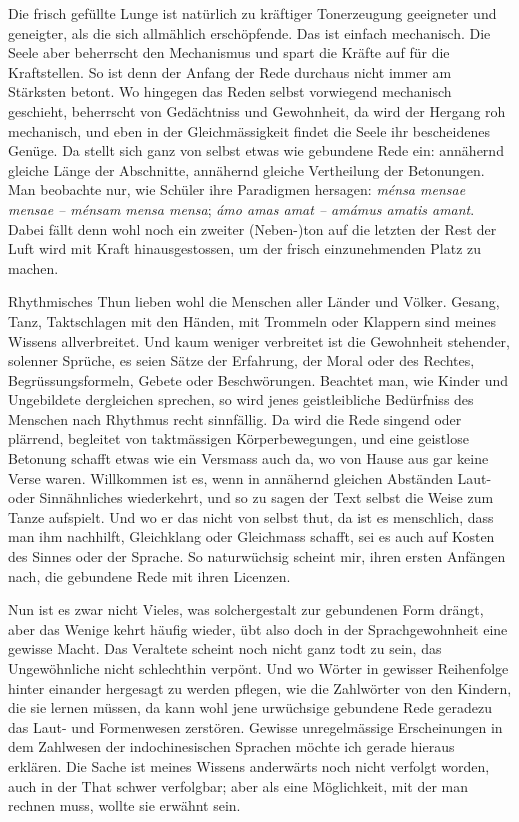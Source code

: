 {Die frisch gefüllte Lunge ist natürlich zu kräftiger Tonerzeugung geeigneter und geneigter, als die sich allmählich erschöpfende. Das ist einfach mechanisch. Die Seele aber beherrscht den Mechanismus und \label{fp.224} spart die Kräfte auf für die Kraftstellen. So ist denn der Anfang der Rede durchaus nicht immer am Stärksten betont. Wo hingegen das Reden selbst vorwiegend mechanisch geschieht, beherrscht von Gedächtniss und Gewohnheit, da wird der Hergang roh mechanisch, und eben in der  Gleichmässigkeit findet die Seele ihr bescheidenes Genüge. Da stellt sich ganz von selbst etwas wie gebundene Rede ein: annähernd gleiche Länge der Abschnitte, annähernd gleiche Vertheilung der Betonungen. Man beobachte nur, wie Schüler ihre Paradigmen hersagen: \textit{ménsa mensae mensae – ménsam mensa mensa}; \textit{ámo amas amat – amámus amatis amant}. Dabei fällt denn wohl noch ein zweiter (Neben-)ton auf die letzten   der Rest der Luft wird mit Kraft hinausgestossen, um der frisch einzunehmenden Platz zu machen.

Rhythmisches Thun lieben wohl die Menschen aller Länder und Völker. Gesang, Tanz, Taktschlagen mit den Händen, mit Trommeln oder Klappern sind meines Wissens allverbreitet. Und kaum weniger verbreitet ist die Gewohnheit stehender, solenner Sprüche, es seien Sätze der Erfahrung, der Moral oder des Rechtes, Begrüssungsformeln, Gebete oder Beschwörungen. Beachtet man, wie Kinder und Ungebildete dergleichen sprechen, so wird jenes geistleibliche Bedürfniss des Menschen nach Rhythmus recht sinnfällig. Da wird die Rede singend oder plärrend, begleitet von taktmässigen Körperbewegungen, und eine geistlose Betonung schafft etwas wie ein Versmass auch da, wo von Hause aus gar keine Verse waren. Willkommen ist es, wenn in annähernd gleichen Abständen Laut- oder Sinnähnliches wiederkehrt, und so zu sagen der Text selbst die Weise zum Tanze aufspielt. Und wo er das nicht von selbst thut, da ist es menschlich, dass man ihm nachhilft, Gleichklang oder Gleichmass schafft, sei es auch auf Kosten des Sinnes oder der Sprache. So naturwüchsig scheint mir, ihren ersten Anfängen nach, die gebundene Rede mit ihren Licenzen.

Nun ist es zwar nicht Vieles, was solchergestalt zur gebundenen Form drängt, aber das Wenige kehrt häufig wieder, übt also doch in der Sprachgewohnheit eine gewisse Macht. Das Veraltete scheint noch nicht ganz todt zu sein, das Ungewöhnliche nicht schlechthin verpönt. Und wo Wörter in gewisser Reihenfolge hinter einander hergesagt zu werden pflegen, wie die Zahlwörter von den Kindern, die sie lernen müssen, da kann wohl jene urwüchsige gebundene Rede geradezu das Laut- und Formenwesen zerstören. Gewisse unregelmässige Erschei\-\label{fp.225}nungen in dem Zahlwesen der indochinesischen Sprachen \label{sp.227} möchte ich gerade hieraus erklären. Die Sache ist meines Wissens anderwärts noch nicht verfolgt worden, auch in der That schwer verfolgbar; aber als eine Möglichkeit, mit der man rechnen muss, wollte sie erwähnt sein.

}
